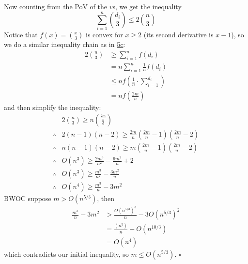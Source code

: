 \documentclass[12pt]{article}
\begin{document}
\begin{enumerate}
        Now counting from the PoV of the $v$s, we get the inequality
        \[\sum_{i=1}^{n} \binom{d_i}{3} \le 2\binom{n}{3}\]
        Notice that $f(x)=\binom{x}{3}$ is convex for $x \ge 2$
        (its second derivative is $x-1$), so we do a similar inequality chain as in \hyperref[prob:5c]{5c}:
        \begin{align*}
            2\binom{n}{3}
             & \ge \sum_{i=1}^{n} f(d_i)                              \\
             & = n \sum_{i=1}^{n} \frac{1}{n} f(d_i)                  \\
             & \le n f\left(\frac{1}{n} \cdot \sum_{i=1}^{d_i}\right) \\
             & = n f\left(\frac{2m}{n}\right)
        \end{align*}
        and then simplify the inequality:
        \begin{align*}
                         & 2\binom{n}{3} \ge n\binom{\frac{2m}{n}}{3}                                         \\
            \therefore{} & 2(n-1)(n-2) \ge \frac{2m}{n}\left(\frac{2m}{n}-1\right)\left(\frac{2m}{n}-2\right) \\
            \therefore{} & n(n-1)(n-2) \ge m\left(\frac{2m}{n}-1\right)\left(\frac{2m}{n}-2\right) \\
            \therefore{} & O\left(n^3\right) \ge \frac{2m^3}{n^2} - \frac{6m^2}{n} + 2 \\
            \therefore{} & O\left(n^3\right) \ge \frac{m^3}{n^2}-\frac{3m^2}{n} \\
            \therefore{} & O\left(n^4\right) \ge \frac{m^3}{n}-3m^2
        \end{align*}
        BWOC suppose $m > O\left(n^{5/3}\right)$, then
        \begin{align*}
            \frac{m^3}{n}-3m^2
            &> \frac{O\left(n^{5/3}\right)^3}{n}-3O\left(n^{5/3}\right)^2 \\
            &= \frac{\left(n^5\right)}{n}-O\left(n^{10/3}\right) \\
            &= O\left(n^4\right)
        \end{align*}
        which contradicts our initial inequality, so $m \le O\left(n^{5/3}\right)$. $\square$
\end{enumerate}
\end{document}
